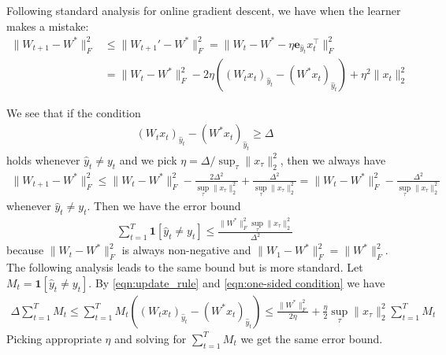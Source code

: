 \documentclass{article}
\newcommand{\one}{\boldsymbol{1}}
\newcommand{\e}{\mathbf{e}}
\begin{document}
Following standard analysis for online gradient descent, we have when the learner makes a mistake:
\begin{align}
    \|W_{t+1}-W^*\|_F^2 &\leq \|W_{t+1}'-W^*\|_F^2 = \|W_t - W^* - \eta \e_{\hat{y}_t}x_t^\top \|_F^2 \nonumber \\
    &= \|W_t-W^*\|_F^2 - 2\eta ((W_tx_t)_{\hat{y}_t} - (W^*x_t)_{\hat{y}_t}) + \eta^2\|x_t\|_2^2 
    \label{eqn:update_rule}
\end{align}

We see that if the condition 
\begin{align}
    (W_tx_t)_{\hat{y}_t} - (W^*x_t)_{\hat{y}_t} \geq \Delta  \label{eqn:one-sided condition}
\end{align}
holds whenever $\hat{y}_t\neq y_t$ and we pick $\eta = \Delta/\sup_\tau\|x_\tau\|_2^2$, then we always have
\begin{align*}
    \|W_{t+1}-W^*\|_F^2 \leq \|W_{t}-W^*\|_F^2 -\frac{2\Delta^2}{\sup_\tau\|x_\tau\|_2^2} + \frac{\Delta^2}{\sup_\tau\|x_\tau\|_2^2} = \|W_{t}-W^*\|_F^2 - \frac{\Delta^2}{\sup_\tau\|x_\tau\|_2^2} 
\end{align*}
whenever $\hat{y}_t\neq y_t$. Then we have the error bound 
\begin{align*}
    \sum_{t=1}^T \one[\hat{y}_t\neq y_t] \leq \frac{\|W^*\|_F^2 \sup_{\tau}\|x_\tau\|_2^2}{\Delta^2}   
\end{align*}
because $\|W_t - W^*\|_F^2$ is always non-negative and $\|W_1-W^*\|_F^2=\|W^*\|_F^2$. \\

The following analysis leads to the same bound but is more standard. Let $M_t=\one[\hat{y}_t\neq y_t]$. By \eqref{eqn:update_rule} and \eqref{eqn:one-sided condition} we have
\begin{align*}
    \Delta \sum_{t=1}^T M_t  \leq \sum_{t=1}^T M_t\left((W_tx_t)_{\hat{y}_t} - (W^*x_t)_{\hat{y}_t}\right) \leq \frac{\|W^*\|_F^2}{2\eta} + \frac{\eta}{2}\sup_\tau\|x_\tau\|_2^2\sum_{t=1}^T M_t
\end{align*}
Picking appropriate $\eta$ and solving for $\sum_{t=1}^T M_t$ we get the same error bound. 
\end{document}
